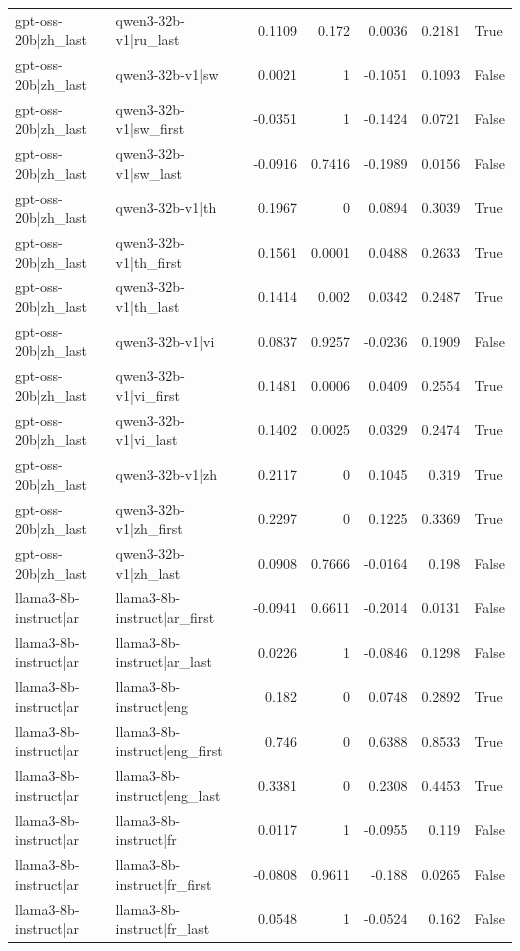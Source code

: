 \begin{table}
\begin{tabular}{l l r r r r l}
gpt-oss-20b|zh_last & qwen3-32b-v1|ru_last & 0.1109 & 0.172 & 0.0036 & 0.2181 & True \\
gpt-oss-20b|zh_last & qwen3-32b-v1|sw & 0.0021 & 1 & -0.1051 & 0.1093 & False \\
gpt-oss-20b|zh_last & qwen3-32b-v1|sw_first & -0.0351 & 1 & -0.1424 & 0.0721 & False \\
gpt-oss-20b|zh_last & qwen3-32b-v1|sw_last & -0.0916 & 0.7416 & -0.1989 & 0.0156 & False \\
gpt-oss-20b|zh_last & qwen3-32b-v1|th & 0.1967 & 0 & 0.0894 & 0.3039 & True \\
gpt-oss-20b|zh_last & qwen3-32b-v1|th_first & 0.1561 & 0.0001 & 0.0488 & 0.2633 & True \\
gpt-oss-20b|zh_last & qwen3-32b-v1|th_last & 0.1414 & 0.002 & 0.0342 & 0.2487 & True \\
gpt-oss-20b|zh_last & qwen3-32b-v1|vi & 0.0837 & 0.9257 & -0.0236 & 0.1909 & False \\
gpt-oss-20b|zh_last & qwen3-32b-v1|vi_first & 0.1481 & 0.0006 & 0.0409 & 0.2554 & True \\
gpt-oss-20b|zh_last & qwen3-32b-v1|vi_last & 0.1402 & 0.0025 & 0.0329 & 0.2474 & True \\
gpt-oss-20b|zh_last & qwen3-32b-v1|zh & 0.2117 & 0 & 0.1045 & 0.319 & True \\
gpt-oss-20b|zh_last & qwen3-32b-v1|zh_first & 0.2297 & 0 & 0.1225 & 0.3369 & True \\
gpt-oss-20b|zh_last & qwen3-32b-v1|zh_last & 0.0908 & 0.7666 & -0.0164 & 0.198 & False \\
llama3-8b-instruct|ar & llama3-8b-instruct|ar_first & -0.0941 & 0.6611 & -0.2014 & 0.0131 & False \\
llama3-8b-instruct|ar & llama3-8b-instruct|ar_last & 0.0226 & 1 & -0.0846 & 0.1298 & False \\
llama3-8b-instruct|ar & llama3-8b-instruct|eng & 0.182 & 0 & 0.0748 & 0.2892 & True \\
llama3-8b-instruct|ar & llama3-8b-instruct|eng_first & 0.746 & 0 & 0.6388 & 0.8533 & True \\
llama3-8b-instruct|ar & llama3-8b-instruct|eng_last & 0.3381 & 0 & 0.2308 & 0.4453 & True \\
llama3-8b-instruct|ar & llama3-8b-instruct|fr & 0.0117 & 1 & -0.0955 & 0.119 & False \\
llama3-8b-instruct|ar & llama3-8b-instruct|fr_first & -0.0808 & 0.9611 & -0.188 & 0.0265 & False \\
llama3-8b-instruct|ar & llama3-8b-instruct|fr_last & 0.0548 & 1 & -0.0524 & 0.162 & False \\

\end{tabular}
\end{table}
